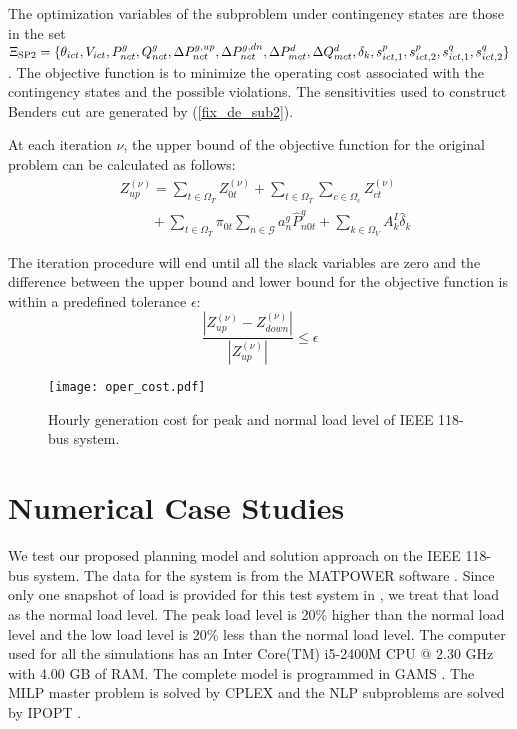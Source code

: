 \documentclass[journal]{IEEEtran}
\newcommand{\splitatcommas}[1]{%
	\begingroup
	\begingroup\lccode`~=`, \lowercase{\endgroup
		\edef~{\mathchar\the\mathcode`, \penalty0 \noexpand\hspace{0pt plus 1em}}%
	}\mathcode`,="8000 #1%
	\endgroup
}
\begin{document}
The optimization variables of the subproblem under contingency states are those in the set $\splitatcommas{\Xi_{\text{SP2}}=\{\theta_{ict},V_{ict},P^g_{nct},Q^g_{nct},\Delta P^{g,up}_{nct},\Delta P^{g,dn}_{nct},\Delta P^d_{mct},\Delta Q^d_{mct},\delta_k,s^p_{ict,1},s^p_{ict,2},s^q_{ict,1},s^q_{ict,2}\}}$. The objective function is to minimize the operating cost associated with the contingency states and the possible violations. The sensitivities used to construct Benders cut are generated by (\ref{fix_de_sub2}).

At each iteration $\nu$, the upper bound of the objective function for the original problem can be calculated as follows:
\begin{align}
&Z_{up}^{(\nu)}=\sum_{t \in \Omega_T}Z_{0t}^{(\nu)}+\sum_{t \in \Omega_T}\sum_{c \in \Omega_c}Z_{ct}^{(\nu)} \nonumber \\
&\ \ \ \ \ \ \ \ \ \ +\sum_{t\in \Omega_T}\pi_{0t}\sum_{n \in \mathcal{G}}{a^g_n\hat{P}_{n0t}^{g}}+\sum_{k\in \Omega_V}A^I_k\hat{\delta}_k
\end{align} 

The iteration procedure will end until all the slack variables are zero and the difference between the upper bound and lower bound for the objective function is within a predefined tolerance $\epsilon$:
\begin{equation}
\frac{|Z_{up}^{(\nu)}-Z_{down}^{(\nu)}|}{|Z_{up}^{(\nu)}|}\le \epsilon
\end{equation} 

\begin{figure*}[!htb]
	\centering
	\texttt{[image: oper\_cost.pdf]}
	\caption{Hourly generation cost for peak and normal load level of IEEE 118-bus system.}
	\label{oper_cost_118}
\end{figure*}

\section{Numerical Case Studies}
\label{case_study}
We test our proposed planning model and solution approach on the IEEE 118-bus system. The data for the system is from the MATPOWER software \cite{mybibb:MATPOW}. Since only one snapshot of load is provided for this test system in \cite{mybibb:MATPOW}, we treat that load as the normal load level. The peak load level is 20\% higher than the normal load level and the low load level is 20\% less than the normal load level. The computer used for all the simulations has an Inter Core(TM) i5-2400M CPU @ 2.30 GHz with 4.00 GB of RAM. The complete model is programmed in GAMS \cite{mybibb:GAMS}. The MILP master problem is solved by CPLEX \cite{mybibb:CPLEX} and the NLP subproblems are solved by IPOPT \cite{mybibb:ipopt}. 
\end{document}
